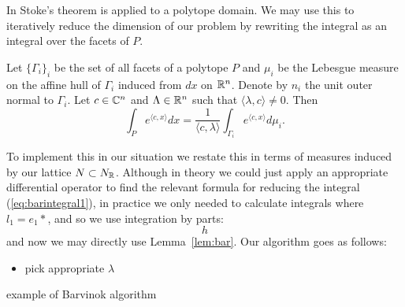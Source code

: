 In \cite{barvinok} Stoke's theorem is applied to a polytope domain. We may use this to iteratively reduce the dimension of our problem by rewriting the integral as an integral over the facets of \(P\).
\begin{lemma} \label{lem:bar}
Let \(\{\Gamma_i\}_i\) be the set of all facets of a polytope \(P\) and \(\mu_i\) be the Lebesgue measure on the affine hull of \(\Gamma_i\) induced from \(dx\) on \(\mathbb{R}^n\). Denote by \(n_i\) the unit outer normal to \(\Gamma_i\). Let \(c \in \mathbb{C}^n\) and \(\Lambda \in \mathbb{R}^n\) such that \(\langle \lambda, c \rangle \neq 0\). Then
\[
\int_P e^{\langle c, x \rangle} dx = \frac{1}{\langle c , \lambda \rangle} \int_{\Gamma_i} e^{\langle c, x \rangle} d \mu_i.
\]
\end{lemma}
To implement this in our situation we restate this in terms of measures induced by our lattice \(N \subset N_{\mathbb{R}}\). Although in theory we could just apply an appropriate differential operator to find the relevant formula for reducing the integral (\ref{eq:barintegral1}), in practice we only needed to calculate integrals where \(l_1 = e_1*\), and so we use integration by parts:
\[
h
\]
and now we may directly use Lemma~\ref{lem:bar}. Our algorithm goes as follows:
\begin{itemize}
\item pick appropriate \(\lambda\) 
\end{itemize}
\begin{example}
example of Barvinok algorithm
\end{example}	